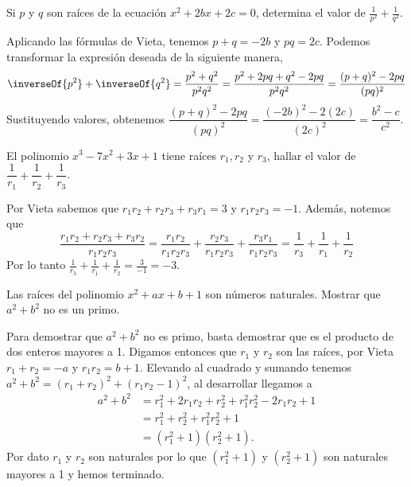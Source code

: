 \begin{example}
    Si $p$ y $q$ son raíces de la ecuación $x^2 + 2bx + 2c = 0$, determina el valor de $\frac{1}{p^2} + \frac{1}{q^2}.$
\end{example}
\begin{solution}
    Aplicando las fórmulas de Vieta, tenemos $p + q = - 2b$ y $pq = 2c$.
    Podemos transformar la expresión deseada de la siguiente manera,
    \[
        \inverseOf{p^2} + \inverseOf{q^2} = \frac{p^2 + q^2}{p^2 q^2} = \frac{p^2 + 2pq + q^2 - 2pq}{p^2 q^2} = \frac{ (p + q)^2 - 2pq}{(pq)^2}
    \]
    Sustituyendo valores, obtenemos $\dfrac{(p + q)^2 - 2pq}{(pq)^2} = \dfrac{ (-2b)^2 - 2(2c)}{(2c)^2} = \boxed{\dfrac{b^2 - c}{c^2}}$.
\end{solution}

\begin{example}
    El polinomio $x^3 - 7 x^2 + 3x + 1$ tiene raíces $r_1, r_2$ y  $r_3$, hallar el valor de $\dfrac{1}{r_1} + \dfrac{1}{r_2} + \dfrac{1}{r_3}$.
\end{example}
\begin{solution}
    Por Vieta sabemos que $r_1 r_2 + r_2 r_3 + r_3 r_1 = 3$ y $r_1 r_2 r_3 = -1$.
    Además, notemos que
    \[
        \frac{r_1 r_2 + r_2 r_3 + r_3 r_2}{r_1 r_2 r_3} = \frac{r_1 r_2}{r_1 r_2 r_3} + \frac{r_2 r_3}{r_1 r_2 r_3} + \frac{r_3 r_1}{r_1 r_2 r_3} = \frac{1}{r_3} + \frac{1}{r_1} + \frac{1}{r_2}
    \]
    Por lo tanto $\frac{1}{r_3} + \frac{1}{r_1} + \frac{1}{r_2} = \frac{3}{-1} = \boxed{-3}$.
\end{solution}

\begin{example}[1986 URSS]
    Las raíces del polinomio $x^2 + ax + b + 1$ son números naturales.
    Mostrar que $a^2 + b^2$ no es un primo.
\end{example}
\begin{solution}
    Para demostrar que $a^2 + b^2$ no es primo, basta demostrar que es el producto de dos enteros mayores a 1.
    Digamos entonces que $r_1$ y $r_2$ son las raíces, por Vieta $r_1 + r_2 = -a$ y $r_1 r_2 = b + 1$.
    Elevando al cuadrado y sumando tenemos $a^2 + b^2 = (r_1 + r_2)^2 + (r_1 r_2 - 1)^2$, al desarrollar llegamos a
    \begin{align*}
        a^2 + b^2 &= r^2_1 + 2r_1 r_2 + r^2_2 + r^2_1 r^2_2 - 2r_1 r_2 + 1 \\
        &= r^2_1 + r^2_2 + r^2_1 r^2_2+ 1\\
        &= (r^2_1 + 1)(r^2_2 + 1).
    \end{align*}
    Por dato $r_1$ y $r_2$ son naturales por lo que $(r^2_1 + 1)$ y $(r^2_2 + 1)$ son naturales mayores a 1 y hemos terminado.
\end{solution}

